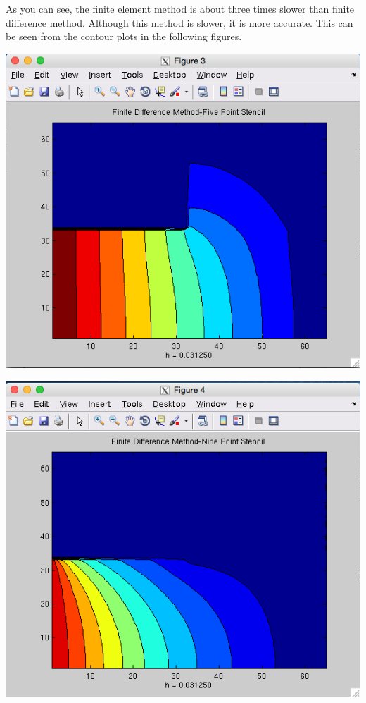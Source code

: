 \documentclass[11pt, oneside]{article}   	%
\begin{document}
\vspace{5mm}

As you can see, the finite element method is about three times slower than finite difference method. Although this method is slower, it is more accurate. This can be seen from the contour plots in the following figures. \\

\centerline{\includegraphics[scale = 0.55]{FDM_fivePoint.png}}

\vspace{5mm}

\centerline{\includegraphics[scale = 0.55]{FDM_ninePoint.png}}
\end{document}
